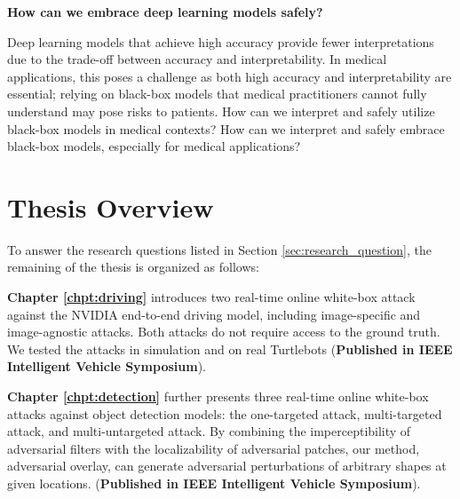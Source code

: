 \vspace{0.5cm}

\textbf{How can we embrace deep learning models safely?}

Deep learning models that achieve high accuracy provide fewer interpretations due to the trade-off between accuracy and interpretability. In medical applications, this poses a challenge as both high accuracy and interpretability are essential; relying on black-box models that medical practitioners cannot fully understand may pose risks to patients. How can we interpret and safely utilize black-box models in medical contexts? How can we interpret and safely embrace black-box models, especially for medical applications?



\section{Thesis Overview}

To answer the research questions listed in Section \ref{sec:research_question}, the remaining of the thesis is organized as follows:

\vspace{0.5cm}



\noindent \textbf{Chapter \ref{chpt:driving}} introduces two real-time online white-box attack against the NVIDIA end-to-end driving model, including image-specific and image-agnostic attacks. Both attacks do not require access to the ground truth. We tested the attacks in simulation and on real Turtlebots (\textbf{Published in IEEE Intelligent Vehicle Symposium}).

\vspace{0.5cm}

\noindent \textbf{Chapter \ref{chpt:detection}} further presents three real-time online white-box attacks against object detection models: the one-targeted attack, multi-targeted attack, and multi-untargeted attack. By combining the imperceptibility of adversarial filters with the localizability of adversarial patches, our method, adversarial overlay, can generate adversarial perturbations of arbitrary shapes at given locations. (\textbf{Published in IEEE Intelligent Vehicle Symposium}). 

